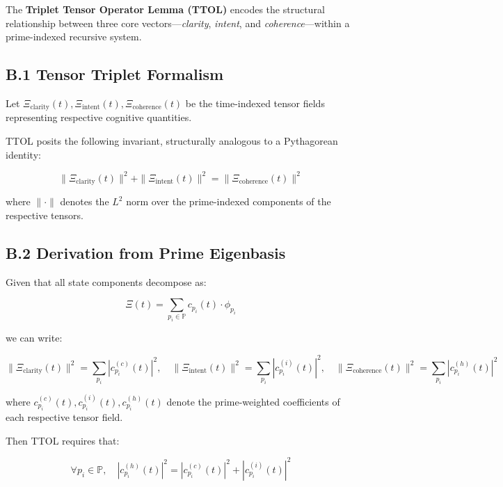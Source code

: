 \documentclass[12]{amsart}
\theoremstyle{plain}
\begin{document}
The \textbf{Triplet Tensor Operator Lemma (TTOL)} encodes the structural relationship between three core vectors—\textit{clarity}, \textit{intent}, and \textit{coherence}—within a prime-indexed recursive system.

\subsection*{B.1 Tensor Triplet Formalism}

Let $\Xi_{\text{clarity}}(t), \Xi_{\text{intent}}(t), \Xi_{\text{coherence}}(t)$ be the time-indexed tensor fields representing respective cognitive quantities.

TTOL posits the following invariant, structurally analogous to a Pythagorean identity:

\begin{equation}
\|\Xi_{\text{clarity}}(t)\|^2 + \|\Xi_{\text{intent}}(t)\|^2 = \|\Xi_{\text{coherence}}(t)\|^2
\label{eq:ttol_base}
\end{equation}

\noindent
where $\| \cdot \|$ denotes the $L^2$ norm over the prime-indexed components of the respective tensors.

\subsection*{B.2 Derivation from Prime Eigenbasis}

Given that all state components decompose as:

\begin{equation}
\Xi(t) = \sum_{p_i \in \mathbb{P}} c_{p_i}(t) \cdot \phi_{p_i}
\end{equation}

we can write:

\begin{equation}
\|\Xi_{\text{clarity}}(t)\|^2 = \sum_{p_i} |c^{(c)}_{p_i}(t)|^2, \quad
\|\Xi_{\text{intent}}(t)\|^2 = \sum_{p_i} |c^{(i)}_{p_i}(t)|^2, \quad
\|\Xi_{\text{coherence}}(t)\|^2 = \sum_{p_i} |c^{(h)}_{p_i}(t)|^2
\end{equation}

\noindent
where $c^{(c)}_{p_i}(t), c^{(i)}_{p_i}(t), c^{(h)}_{p_i}(t)$ denote the prime-weighted coefficients of each respective tensor field.

Then TTOL requires that:

\begin{equation}
\forall p_i \in \mathbb{P}, \quad |c^{(h)}_{p_i}(t)|^2 = |c^{(c)}_{p_i}(t)|^2 + |c^{(i)}_{p_i}(t)|^2
\end{equation}
\end{document}
